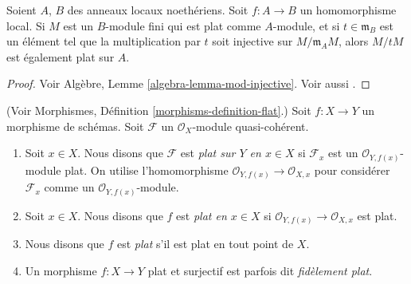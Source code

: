 \begin{theorem}
\label{theorem-flatness-grothendieck}
Soient $A$, $B$ des anneaux locaux noethériens.
Soit $f : A \to B$ un homomorphisme local.
Si $M$ est un $B$-module fini qui est plat comme $A$-module,
et si $t \in \mathfrak m_B$ est un élément tel que la multiplication
par $t$ soit injective sur $M/\mathfrak m_AM$, alors $M/tM$ est également plat sur $A$.
\end{theorem}

\begin{proof}
Voir Algèbre, Lemme \ref{algebra-lemma-mod-injective}.
Voir aussi \cite[section 20]{MatCA}.
\end{proof}

\begin{definition}
\label{definition-flat-schemes}
(Voir Morphismes, Définition \ref{morphisms-definition-flat}.)
Soit $f : X \to Y$ un morphisme de schémas.
Soit $\mathcal{F}$ un $\mathcal{O}_X$-module quasi-cohérent.
\begin{enumerate}
\item Soit $x \in X$. Nous disons que $\mathcal{F}$ est
{\it plat sur $Y$ en $x \in X$} si $\mathcal{F}_x$
est un $\mathcal{O}_{Y, f(x)}$-module plat.
On utilise l'homomorphisme $\mathcal{O}_{Y, f(x)} \to \mathcal{O}_{X, x}$ pour
considérer $\mathcal{F}_x$ comme un $\mathcal{O}_{Y, f(x)}$-module.
\item Soit $x \in X$. Nous disons que $f$ est {\it plat en $x \in X$}
si $\mathcal{O}_{Y, f(x)} \to \mathcal{O}_{X, x}$ est plat.
\item Nous disons que $f$ est {\it plat} s'il est plat en tout point de $X$.
\item Un morphisme $f : X \to Y$ plat et surjectif est parfois
dit {\it fidèlement plat}.
\end{enumerate}
\end{definition}

